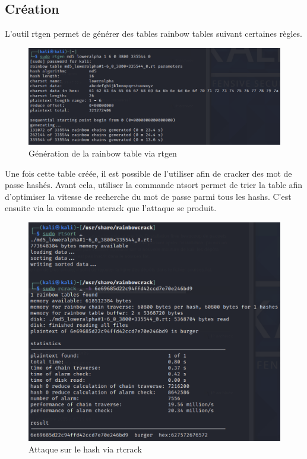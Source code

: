 \documentclass[12pt, oneside]{article}
\begin{document}
\subsection{Création}
L'outil rtgen permet de générer des tables rainbow tables suivant certaines règles.
\begin{figure}[H]
\centering
\includegraphics[scale=0.4]{rainbow}
\caption{Génération de la rainbow table via rtgen}
\end{figure}
Une fois cette table créée, il est possible de l'utiliser afin de cracker des mot de passe hashés. Avant cela, utiliser la commande ntsort permet de trier la table afin d'optimiser la vitesse de recherche du mot de passe parmi tous les hashs. C'est ensuite via la commande ntcrack que l'attaque se produit.
\begin{figure}[H]
\centering
\includegraphics[scale=0.4]{rtcrack}
\caption{Attaque sur le hash via rtcrack}
\end{figure}
\end{document}
